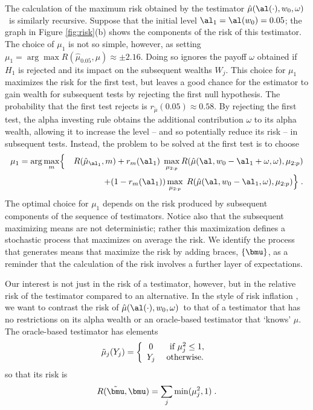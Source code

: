 \documentclass[12pt]{article}
\newcommand{\test}{\mbox{$\hat\mu(\al(\cdot),w_0,\omega)$}}
\begin{document}
 The calculation of the maximum risk obtained by the testimator \test\ is
 similarly recursive.  Suppose that the initial level $\al_1 = \al(w_0)=0.05$;
 the graph in Figure \ref{fig:risk}(b) shows the components of the risk of this
 testimator.  The choice of $\mu_1$ is not so simple, however, as setting $\mu_1
 = \arg \max R(\hat\mu_{0.05},\mu) \approx \pm 2.16$.  Doing so ignores the
 payoff $\omega$ obtained if $H_1$ is rejected and its impact on the subsequent
 wealths $W_j$.  This choice for $\mu_1$ maximizes the risk for the first test,
 but leaves a good chance for the estimator to gain wealth for subsequent tests
 by rejecting the first null hypothesis.  The probability that the first test
 rejects is $r_{\tilde\mu}(0.05) \approx 0.58$.  By rejecting the first test,
 the alpha investing rule obtains the additional contribution $\omega$ to its
 alpha wealth, allowing it to increase the level -- and so potentially reduce
 its risk -- in subsequent tests.  Instead, the problem to be solved at the
 first test is to choose
 \begin{eqnarray*}
    \mu_1 = \arg \max_{m} & \Bigl\{ & R(\hat\mu_{\al_1},m) \Bigr. 
        + r_{m}(\al_1) \; \max_{\mu_{2:p}} 
              R(\hat\mu(\al,w_0-\al_1+\omega,\omega),\mu_{2:p})\cr
    & & + \Bigl. (1-r_{m}(\al_1)) \max_{\mu_{2:p}} \; 
              R(\hat\mu(\al,w_0-\al_1,\omega),\mu_{2:p}) \Bigr\} \;.
 \end{eqnarray*}
 The optimal choice for $\mu_1$ depends on the risk produced by subsequent
 components of the sequence of testimators.  Notice also that the subsequent
 maximizing means are not deterministic; rather this maximization defines a
 stochastic process that maximizes on average the risk.  We identify the process
 that generates means that maximize the risk by adding braces, $\{\bmu\}$, as a
 reminder that the calculation of the risk involves a further layer of
 expectations.  


 Our interest is not just in the risk of a testimator, however, but in the
 relative risk of the testimator compared to an alternative.  In the style of
 risk inflation , we want to contrast the risk of \test\ to that of a
 testimator that has no restrictions on its alpha wealth or an oracle-based
 testimator that `knows' $\mu$.  The oracle-based testimator has elements
 \begin{equation}
   \tilde\mu_j(Y_j) = \left\{ \begin{array}{cc} 
                       0    & \mbox{ if } \mu_j^2 \le 1,        \cr
                       Y_j  & \mbox{ otherwise. }
                \end{array} \right.
 \label{eq:muTilde}
 \end{equation}
 so that its risk is 
 \begin{equation}
    R(\tilde{\bmu},\bmu) = \sum_j \min(\mu_j^2,1) \;.   
 \label{eq:riskMuTilde}
 \end{equation}
\end{document}
